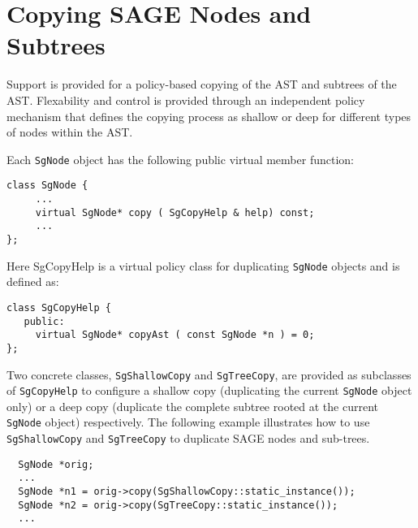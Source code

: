 \section { Copying SAGE Nodes and Subtrees}

    Support is provided for a policy-based copying of the AST and subtrees
of the AST.  Flexability and control is provided through an independent
policy mechanism that defines the copying process as shallow or deep for
different types of nodes within the AST.


  Each {\tt SgNode} object has the following public virtual member function: 

{\indent
{\mySmallFontSize

\begin{verbatim}
class SgNode {
     ...
     virtual SgNode* copy ( SgCopyHelp & help) const;
     ...
};
\end{verbatim}
}}

  Here SgCopyHelp is a virtual policy class for duplicating 
{\tt SgNode} objects and is defined as:

{\indent
{\mySmallFontSize

\begin{verbatim}
class SgCopyHelp {
   public:
     virtual SgNode* copyAst ( const SgNode *n ) = 0;
};
\end{verbatim}
}}

Two concrete classes, {\tt SgShallowCopy} and {\tt SgTreeCopy}, are provided as 
subclasses of {\tt SgCopyHelp} to configure a shallow copy (duplicating 
the current {\tt SgNode} object only) or a deep copy (duplicate the complete
subtree rooted at the current {\tt SgNode} object) respectively. The following
example illustrates how to use {\tt SgShallowCopy} and {\tt SgTreeCopy} 
to duplicate SAGE nodes and sub-trees.

{\indent
{\mySmallFontSize

\begin{verbatim}
  SgNode *orig;
  ...
  SgNode *n1 = orig->copy(SgShallowCopy::static_instance());
  SgNode *n2 = orig->copy(SgTreeCopy::static_instance());
  ... 
\end{verbatim}
}}

